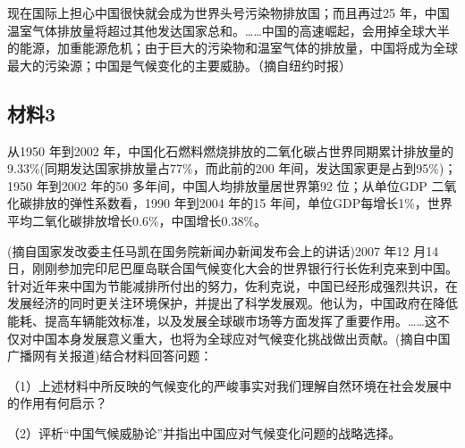 \documentclass[UTF8,11pt]{ctexart}
\begin{document}
现在国际上担心中国很快就会成为世界头号污染物排放国；而且再过25 年，中国温室气体排放量将超过其他发达国家总和。……中国的高速崛起，会用掉全球大半的能源，加重能源危机；由于巨大的污染物和温室气体的排放量，中国将成为全球最大的污染源；中国是气候变化的主要威胁。（摘自纽约时报）


\subsection*{材料3}

从1950 年到2002 年，中国化石燃料燃烧排放的二氧化碳占世界同期累计排放量的9.33\%(同期发达国家排放量占77\%，而此前的200 年间，发达国家更是占到95\%)；1950 年到2002 年的50 多年间，中国人均排放量居世界第92 位；从单位GDP 二氧化碳排放的弹性系数看，1990 年到2004 年的15 年间，单位GDP每增长1\%，世界平均二氧化碳排放增长0.6\%，中国增长0.38\%。

(摘自国家发改委主任马凯在国务院新闻办新闻发布会上的讲话)2007 年12 月14 日，刚刚参加完印尼巴厘岛联合国气候变化大会的世界银行行长佐利克来到中国。针对近年来中国为节能减排所付出的努力，佐利克说，中国已经形成强烈共识，在发展经济的同时更关注环境保护，并提出了科学发展观。他认为，中国政府在降低能耗、提高车辆能效标准，以及发展全球碳市场等方面发挥了重要作用。……这不仅对中国本身发展意义重大，也将为全球应对气候变化挑战做出贡献。(摘自中国广播网有关报道)结合材料回答问题：

（1）上述材料中所反映的气候变化的严峻事实对我们理解自然环境在社会发展中的作用有何启示？


（2）评析“中国气候威胁论”并指出中国应对气候变化问题的战略选择。
\end{document}
